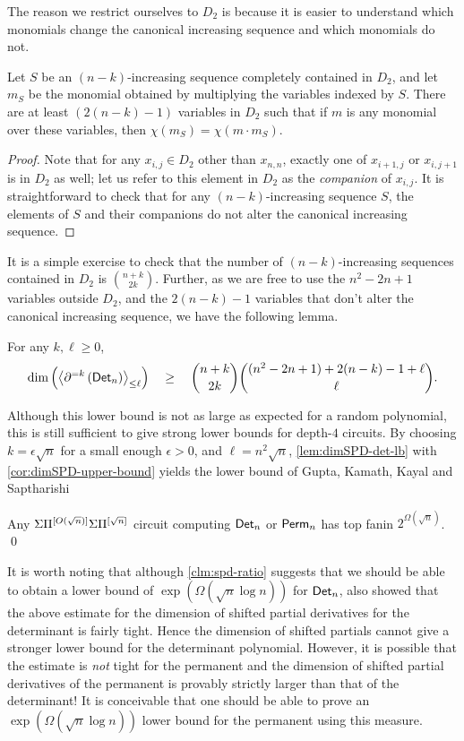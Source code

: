 The reason we restrict ourselves to $D_2$ is because it is easier to understand which monomials change the canonical increasing sequence and which monomials do not. 

\begin{lemma}\label{lem:forbidden-variables}
Let $S$ be an $(n-k)$-increasing sequence completely contained in $D_2$, and let $m_S$ be the monomial obtained by multiplying the variables indexed by $S$. 
There are at least $(2(n-k)-1)$ variables in $D_2$ such that if $m$ is any monomial over these variables, then $\chi(m_S) = \chi(m\cdot m_S)$. 
\end{lemma}
\begin{proof}
Note that for any $x_{i,j} \in D_2$ other than $x_{n,n}$, exactly one of $x_{i+1,j}$ or $x_{i,j+1}$ is in $D_2$ as well; let us refer to this element in $D_2$ as the \emph{companion} of $x_{i,j}$. 
It is straightforward to check that for any $(n-k)$-increasing sequence $S$, the elements of $S$ and their companions do not alter the canonical increasing sequence. 
\end{proof}

It is a simple exercise to check that the number of $(n-k)$-increasing sequences contained in $D_2$ is $\binom{n+k}{2k}$. 
Further, as we are free to use the $n^2 - 2n + 1$ variables outside $D_2$, and the $2(n-k) -1$ variables that don't alter the canonical increasing sequence, we have the following lemma. 

\begin{lemma}\label{lem:dimSPD-det-lb}
For any $k,\ell \geq 0$, 
$$
\dim\left(\left\langle\partial^{=k}\left(\operatorname{\mathsf{Det}}_n\right)\right\rangle_{\leq \ell}\right) \quad \geq \quad \binom{n+k}{2k}\binom{(n^2 - 2n + 1) + 2(n-k) -1 + \ell}{\ell}.
$$
\end{lemma}

Although this lower bound is not as large as expected for a random polynomial, this is still sufficient to give strong lower bounds for depth-$4$ circuits. 
By choosing $k = \epsilon \sqrt{n}$ for a small enough $\epsilon > 0$, and $\ell = n^2 \sqrt{n}$, \autoref{lem:dimSPD-det-lb} with \autoref{cor:dimSPD-upper-bound} yields the lower bound of Gupta, Kamath, Kayal and Saptharishi \cite{gkks13}

\begin{theorem}
Any $\Sigma\Pi^{[O(\sqrt{n})]}\Sigma\Pi^{[\sqrt{n}]}$ circuit computing $\operatorname{\mathsf{Det}}_n$ or $\operatorname{\mathsf{Perm}}_n$ has top fanin $2^{\Omega(\sqrt{n})}$. \qed
\end{theorem}

It is worth noting that although \autoref{clm:spd-ratio} suggests that we should be able to obtain a lower bound of $\exp(\Omega(\sqrt{n}\log n))$ for $\operatorname{\mathsf{Det}}_n$, \cite{gkks13} also showed that the above estimate for the dimension of shifted partial derivatives for the determinant is fairly tight. 
Hence the dimension of shifted partials cannot give a stronger lower bound for the determinant polynomial. 
However, it is possible that the estimate is \emph{not} tight for the permanent and the dimension of shifted partial derivatives of the permanent is provably strictly larger than that of the determinant! 
It is conceivable that one should be able to prove an $\exp(\Omega(\sqrt{n}\log n))$ lower bound for the permanent using this measure. 

